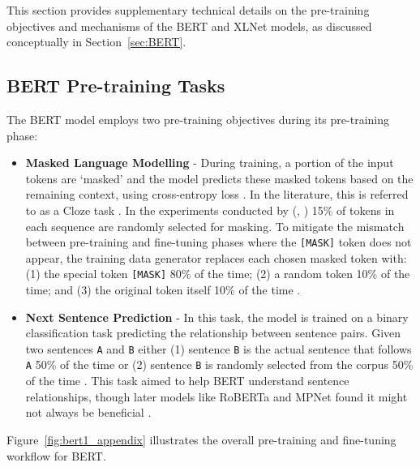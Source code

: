 \documentclass[10pt,oneside]{report}
\renewcommand{\citet}[1]{\citeauthor{#1}, \citeyear{#1}}
\begin{document}
This section provides supplementary technical details on the pre-training objectives and mechanisms of the BERT and XLNet models, as discussed conceptually in Section~\ref{sec:BERT}.

\subsection{BERT Pre-training Tasks}

The BERT model \cite{devlin2019bert} employs two pre-training objectives during its pre-training phase:

\begin{itemize}
    \item \textbf{Masked Language Modelling} - During training, a portion of the input tokens are `masked' and the model predicts these masked tokens based on the remaining context, using cross-entropy loss \cite{zhang2018generalized}. In the literature, this is referred to as a Cloze task \cite{taylor1953cloze}. In the experiments conducted by (\citet{devlin2019bert}) 15\% of tokens in each sequence are randomly selected for masking. To mitigate the mismatch between pre-training and fine-tuning phases where the \texttt{[MASK]} token does not appear, the training data generator replaces each chosen masked token with: (1) the special token \texttt{[MASK]} 80\% of the time; (2) a random token 10\% of the time; and (3) the original token itself 10\% of the time \cite{devlin2019bert}.

    \item \textbf{Next Sentence Prediction} - In this task, the model is trained on a binary classification task predicting the relationship between sentence pairs. Given two sentences \texttt{A} and \texttt{B} either (1) sentence \texttt{B} is the actual sentence that follows \texttt{A} 50\% of the time or (2) sentence \texttt{B} is randomly selected from the corpus 50\% of the time \cite{devlin2019bert}. This task aimed to help BERT understand sentence relationships, though later models like RoBERTa and MPNet found it might not always be beneficial \cite{liu2019roberta, song2020mpnet}.
\end{itemize}

Figure~\ref{fig:bert1_appendix} illustrates the overall pre-training and fine-tuning workflow for BERT.
\end{document}
